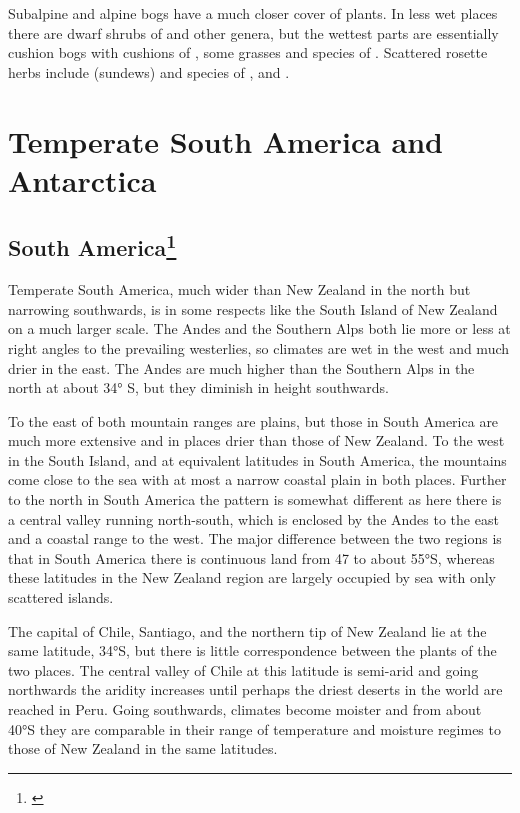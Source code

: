 Subalpine and alpine bogs have a much closer cover of plants.
In less wet places there are dwarf shrubs of  and other genera, but the wettest parts are essentially cushion bogs with cushions of , some grasses and species of .
Scattered rosette herbs include  (sundews) and species of ,  and .

\section{Temperate South America and Antarctica}

\subsection[South America]{South America\thinspace\footnote{\cite{godley1960botany}}}

Temperate South America, much wider than New Zealand in the north but narrowing southwards, is in some respects like the South Island of New Zealand on a much larger scale.
The Andes and the Southern Alps both lie more or less at right angles to the prevailing westerlies, so climates are wet in the west and much drier in the east.
The Andes are much higher than the Southern Alps in the north at about \ang{34} S, but they diminish in height southwards.

To the east of both mountain ranges are plains, but those in South America are much more extensive and in places drier than those of New Zealand.
To the west in the South Island, and at equivalent latitudes in South America, the mountains come close to the sea with at most a narrow coastal plain in both places.
Further to the north in South America the pattern is somewhat different as here there is a central valley running north-south, which is enclosed by the Andes to the east and a coastal range to the west.
The major difference between the two regions is that in South America there is continuous land from 47 to about \ang{55}S, whereas these latitudes in the New Zealand region are largely occupied by sea with only scattered islands.

The capital of Chile, Santiago, and the northern tip of New Zealand lie at the same latitude, \ang{34}S, but there is little correspondence between the plants of the two places.
The central valley of Chile at this latitude is semi-arid and going northwards the aridity increases until perhaps the driest deserts in the world are reached in Peru.
Going southwards, climates become moister and from about \ang{40}S they are comparable in their range of temperature and moisture regimes to those of New Zealand in the same latitudes.


